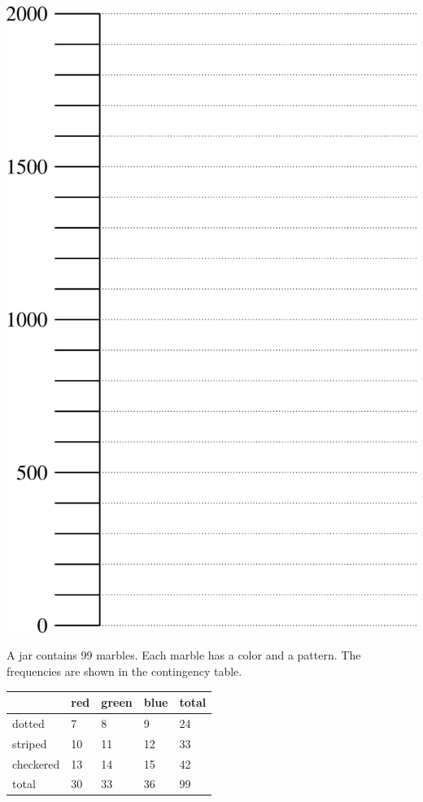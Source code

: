 \documentclass[12pt,letterpaper,addpoints]{exam}
\begin{document}
\begin{questions}
\vfill 
\\ \hfill
\includegraphics[scale=0.7]{figures/boxplot_axis.png}


\newpage 

\question[16] A jar contains 99 marbles. Each marble has a color and a pattern. The frequencies are shown in the contingency table.
\begin{center}
\begin{tabularx}{0.6\textwidth}{|Y|Y Y Y|Y|}\hline
          & red & green & blue & total\\ \hline
dotted    & 7  & 8  & 9 & 24 \\
striped   & 10 & 11 & 12 & 33 \\
checkered & 13 & 14 & 15 & 42  \\ \hline
total     & 30 & 33 & 36 & 99 \\ \hline
\end{tabularx}
\end{center}
\begin{parts}

\end{parts}
\end{questions}
\end{document}
